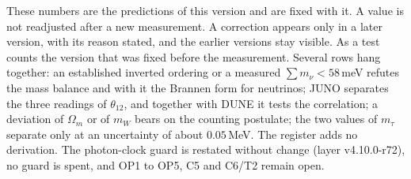 These numbers are the predictions of this version and are fixed with
it. A value is not readjusted after a new measurement. A correction
appears only in a later version, with its reason stated, and the earlier
versions stay visible. As a test counts the version that was fixed
before the measurement. Several rows hang together: an established
inverted ordering or a measured $\sum m_\nu<58$\,meV refutes the mass
balance and with it the Brannen form for neutrinos; JUNO separates the
three readings of $\theta_{12}$, and together with DUNE it tests the
correlation; a deviation of $\Omega_m$ or of $m_W$ bears on the counting
postulate; the two values of $m_\tau$ separate only at an uncertainty
of about $0.05$\,MeV. The register adds no derivation. The photon-clock
guard is restated without change (layer v4.10.0-r72), no guard is spent,
and OP1 to OP5, C5 and C6/T2 remain open.
